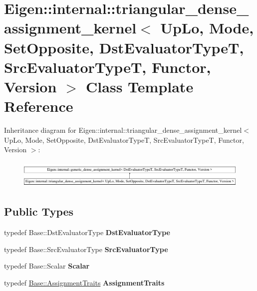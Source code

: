 \hypertarget{class_eigen_1_1internal_1_1triangular__dense__assignment__kernel}{}\section{Eigen\+::internal\+::triangular\+\_\+dense\+\_\+assignment\+\_\+kernel$<$ Up\+Lo, Mode, Set\+Opposite, Dst\+Evaluator\+TypeT, Src\+Evaluator\+TypeT, Functor, Version $>$ Class Template Reference}
\label{class_eigen_1_1internal_1_1triangular__dense__assignment__kernel}
Inheritance diagram for Eigen\+::internal\+::triangular\+\_\+dense\+\_\+assignment\+\_\+kernel$<$ Up\+Lo, Mode, Set\+Opposite, Dst\+Evaluator\+TypeT, Src\+Evaluator\+TypeT, Functor, Version $>$\+:\begin{figure}[H]
\begin{center}
\leavevmode
\includegraphics[height=1.360875cm]{class_eigen_1_1internal_1_1triangular__dense__assignment__kernel}
\end{center}
\end{figure}
\subsection*{Public Types}
\begin{DoxyCompactItemize}
\item 
\mbox{\label{class_eigen_1_1internal_1_1triangular__dense__assignment__kernel_a538006302cf4b32c10780fa9013f4e9f}} 
typedef Base\+::\+Dst\+Evaluator\+Type {\bfseries Dst\+Evaluator\+Type}
\item 
\mbox{\label{class_eigen_1_1internal_1_1triangular__dense__assignment__kernel_a2fd78d76e303aa1632f9c38f0ae520ca}} 
typedef Base\+::\+Src\+Evaluator\+Type {\bfseries Src\+Evaluator\+Type}
\item 
\mbox{\label{class_eigen_1_1internal_1_1triangular__dense__assignment__kernel_af26a98004d1310ab3532fccb54dbf1a4}} 
typedef Base\+::\+Scalar {\bfseries Scalar}
\item 
\mbox{\label{class_eigen_1_1internal_1_1triangular__dense__assignment__kernel_a805139f55fec97674265d10d6e5c5d7e}} 
typedef \mbox{\hyperlink{struct_eigen_1_1internal_1_1copy__using__evaluator__traits}{Base\+::\+Assignment\+Traits}} {\bfseries Assignment\+Traits}
\end{DoxyCompactItemize}
